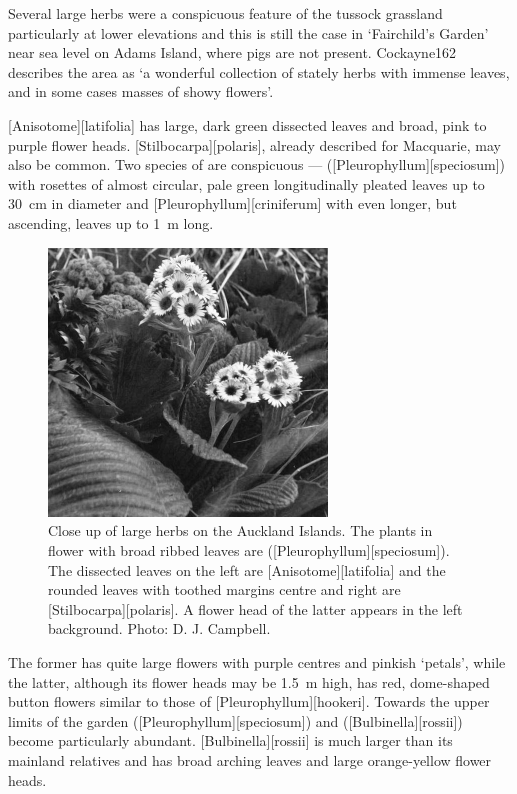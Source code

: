 Several large herbs were a conspicuous feature of the tussock grassland particularly at lower elevations and this is still the case in `Fairchild's Garden' near sea level on Adams Island, where pigs are not present.
Cockayne162 describes the area as `a wonderful collection of stately herbs with immense leaves, and in some cases masses of showy flowers'.

[Anisotome][latifolia] has large, dark green dissected leaves and broad, pink to purple flower heads.
[Stilbocarpa][polaris], already described for Macquarie, may also be common.
Two species of  are conspicuous ---  ([Pleurophyllum][speciosum]) with rosettes of almost circular, pale green longitudinally pleated leaves up to \SI{30}{\centi\metre} in diameter and [Pleurophyllum][criniferum] with even longer, but ascending, leaves up to \SI{1}{\metre} long.
\begin{figure}
	\includegraphics[width=0.66\textwidth]{graphics/fig_117}
	\centering
	\caption[Close up of large herbs on the Auckland Islands]{Close up of large herbs on the Auckland Islands.
	The plants in flower with broad ribbed leaves are  ([Pleurophyllum][speciosum]).
	The dissected leaves on the left are [Anisotome][latifolia] and the rounded leaves with toothed margins centre and right are [Stilbocarpa][polaris].
	A flower head of the latter appears in the left background.
	Photo: D. J. Campbell.}%
	\label{fig:117herbs}
\end{figure}
The former has quite large flowers with purple centres and pinkish `petals', while the latter, although its flower heads may be \SI{1.5}{\metre} high, has red, dome-shaped button flowers similar to those of [Pleurophyllum][hookeri].
Towards the upper limits of the garden  ([Pleurophyllum][speciosum]) and  ([Bulbinella][rossii]) become particularly abundant.
[Bulbinella][rossii] is much larger than its mainland relatives and has broad arching leaves and large orange-yellow flower heads.

